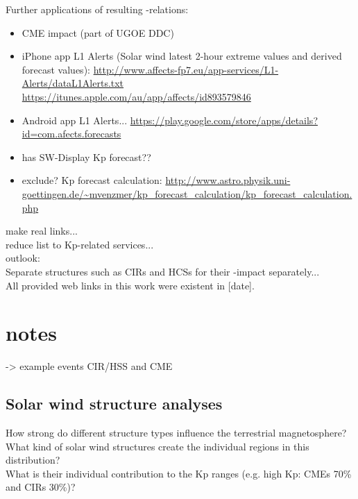 Further applications of resulting \Kp{}-relations:
\begin{itemize}
	\item CME \Kp{} impact (part of UGOE DDC)
	\item iPhone app L1 Alerts (Solar wind latest 2-hour extreme values and derived forecast values): \url{http://www.affects-fp7.eu/app-services/L1-Alerts/dataL1Alerts.txt} \url{https://itunes.apple.com/au/app/affects/id893579846}
	\item Android app L1 Alerts... \url{https://play.google.com/store/apps/details?id=com.afects.forecasts}
	\item has SW-Display Kp forecast??
	\item exclude? Kp forecast calculation: \url{http://www.astro.physik.uni-goettingen.de/~mvenzmer/kp_forecast_calculation/kp_forecast_calculation.php}
\end{itemize}

make real links...\\

reduce list to Kp-related services...\\

outlook:\\
Separate structures such as CIRs and HCSs for their \Kp-impact separately...\\

All provided web links in this work were existent in [date].\\



\section{notes}


-> example events CIR/HSS and CME\\



\subsection{Solar wind structure analyses}
How strong do different structure types influence the terrestrial magnetosphere?\\
What kind of solar wind structures create the individual regions in this distribution?\\
What is their individual contribution to the Kp ranges (e.g. high Kp: CMEs 70\% and CIRs 30\%)?\\

